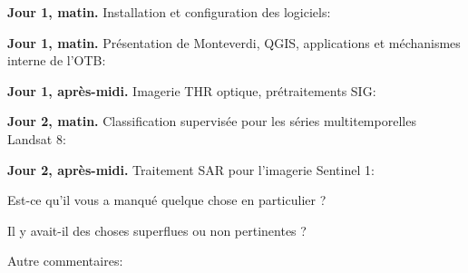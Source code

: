 \documentclass[10pt,a4paper]{article}
\begin{document}
\textbf{Jour 1, matin.} Installation et configuration des logiciels:
\moduleanswer

\textbf{Jour 1, matin.} Présentation de Monteverdi, QGIS, applications et méchanismes interne de l'OTB:
\moduleanswer

\textbf{Jour 1, après-midi.} Imagerie THR optique, prétraitements SIG:
\moduleanswer

\textbf{Jour 2, matin.} Classification supervisée pour les séries multitemporelles Landsat 8:
\moduleanswer

\textbf{Jour 2, après-midi.} Traitement SAR pour l'imagerie Sentinel 1:
\moduleanswer

Est-ce qu'il vous a manqué quelque chose en particulier ?
\vspace{6em}

Il y avait-il des choses superflues ou non pertinentes ?
\vspace{6em}

Autre commentaires:
\end{document}
